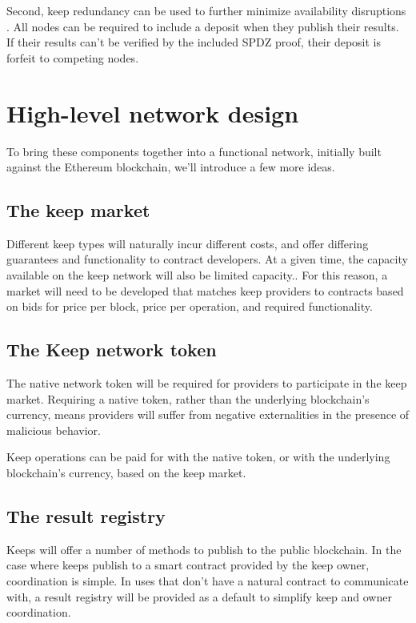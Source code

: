 \documentclass[11pt]{article}
\begin{document}
Second, keep redundancy can be used to further minimize availability
disruptions \cite{blockchainMultipartyComputation}. All nodes can be
required to include a deposit when they publish their results. If
their results can't be verified by the included SPDZ proof, their
deposit is forfeit to competing nodes.

\section{High-level network design}

To bring these components together into a functional network,
initially built against the Ethereum blockchain, we'll introduce a few
more ideas.

\subsection{The keep market}

Different keep types will naturally incur different costs, and offer
differing guarantees and functionality to contract developers. At a
given time, the capacity available on the keep network will also be
limited capacity.. For this reason, a market will need to be developed
that matches keep providers to contracts based on bids for price per
block, price per operation, and required functionality.

\subsection{The Keep network token}

The native network token will be required for providers to participate
in the keep market. Requiring a native token, rather than the
underlying blockchain's currency, means providers will suffer from
negative externalities in the presence of malicious behavior.

Keep operations can be paid for with the native token, or with the
underlying blockchain's currency, based on the keep market.

\subsection{The result registry}

Keeps will offer a number of methods to publish to the public
blockchain. In the case where keeps publish to a smart contract
provided by the keep owner, coordination is simple. In uses that don't
have a natural contract to communicate with, a result registry will be
provided as a default to simplify keep and owner coordination.
\end{document}
